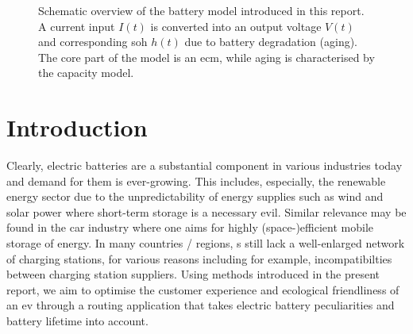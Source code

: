 \documentclass{prettytex/ox/mmsc-special-topic}
\title{\topictitle}
\author{Candidate \candidatenumber}
\date{\today}
\begin{document}
  \pagestyle{plain}
  \mmscSpecialHeader[casestudy]

  \begin{abstract}
    \label{abstract}
    This work will attempt to devise a mathematical model for Lithium-Ion batteries (cf. ) and, building on it, a model for an \gls{ev}.
    We implement the model, a first-order system of s, using the system solver functionality of MATLAB as well as a numerical forward integration scheme.
    We will use the implemented numerical simulator to make progress in a complex route finding problem using real-world road network data obtained from \gls{osm}.

    The first part of this report will focus on the model for a Lithium-Ion battery which was the focus of our project. The electrical behaviour was modelled through the Thevenin \gls{ecm}, in which we also considered battery aging effects. The second part is the route finding and optimisation problem in the context of s, which we approached using the $A^*$-algorithm and a \gls{mcmc} optimisation method.

    Our model was implemented in Python and MATLAB and there is a graphical user interface available with it that provides live insight into the model simulation and route-finding procedure (cf. ).
  \end{abstract}

  \begin{figure}[H]
    \centering
    \caption{Schematic overview of the battery model introduced in this report. A current input $I(t)$ is converted into an output voltage $V(t)$ and corresponding \glsdesc{soh} $h(t)$ due to battery degradation (aging). The core part of the model is an \gls{ecm}, while aging is characterised by the capacity model.}
    \label{fig:model-overview}
  \end{figure}

  \pagebreak
  \pagestyle{normal}

  \section{Introduction}
  Clearly, electric batteries are a substantial component in various industries today and demand for them is ever-growing.
  This includes, especially, the renewable energy sector due to the unpredictability of energy supplies such as wind and solar power where short-term storage is a necessary evil.
  Similar relevance may be found in the car industry where one aims for highly (space-)efficient mobile storage of energy.
  In many countries / regions, s still lack a well-enlarged network of charging stations, for various reasons including for example, incompatibilties between charging station suppliers.
  Using methods introduced in the present report, we aim to optimise the customer experience and ecological friendliness of an \gls{ev} through a routing application that takes electric battery peculiarities and battery lifetime into account.
\end{document}

